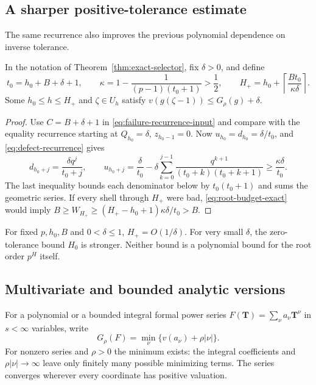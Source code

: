 \subsection{A sharper positive-tolerance estimate}

The same recurrence also improves the previous polynomial dependence
on inverse tolerance.

\begin{theorem}\label{thm:linear-tolerance}
In the notation of Theorem~\ref{thm:exact-selector}, fix $\delta>0$,
and define
\[
 t_0=h_0+B+\delta+1,\qquad
 \kappa=1-\frac1{(p-1)(t_0+1)}>\frac12,
 \qquad
 H_+=h_0+\left\lceil\frac{B t_0}{\kappa\delta}\right\rceil.
\]
Some $h_0\leq h\leq H_+$ and $\zeta\in U_h$ satisfy
$v(g(\zeta-1))\leq G_\rho(g)+\delta$.
\end{theorem}
\begin{proof}
Use $C=B+\delta+1$ in \eqref{eq:failure-recurrence-input} and
compare with the equality recurrence starting at
$Q_{h_0}=\delta$, $z_{h_0-1}=0$.  Now
$u_{h_0}=d_{h_0}=\delta/t_0$, and
\eqref{eq:defect-recurrence} gives
\[
 d_{h_0+j}=\frac{\delta q^j}{t_0+j},\qquad
 u_{h_0+j}=\frac\delta{t_0}
  -\delta\sum_{k=0}^{j-1}
       \frac{q^{k+1}}{(t_0+k)(t_0+k+1)}
 \geq\frac{\kappa\delta}{t_0}.
\]
The last inequality bounds each denominator below by $t_0(t_0+1)$
and sums the geometric series.  If every shell through $H_+$ were
bad, \eqref{eq:root-budget-exact} would imply
$B\geq W_{H_+}\geq(H_+-h_0+1)\kappa\delta/t_0>B$.
\end{proof}

For fixed $p,h_0,B$ and $0<\delta\leq1$, $H_+=O(1/\delta)$.
For very small $\delta$, the zero-tolerance bound $H_0$ is stronger.
Neither bound is a polynomial bound for the root order $p^H$ itself.

\subsection{Multivariate and bounded analytic versions}

For a polynomial or a bounded integral formal power series
$F(\mathbf T)=\sum_\nu a_\nu\mathbf T^\nu$ in $s<\infty$ variables,
write
\[
 G_\rho(F)=\min_\nu\{v(a_\nu)+\rho|\nu|\}.
\]
For nonzero series and $\rho>0$ the minimum exists: the integral
coefficients and $\rho|\nu|\to\infty$ leave only finitely many
possible minimizing terms.  The series converges wherever every
coordinate has positive valuation.

